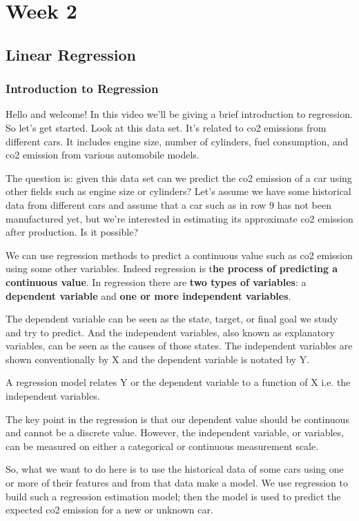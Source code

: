 \chapter{Week 2}
\section{Linear Regression}

	\subsection{Introduction to Regression}	
	
	Hello and welcome! In this video we'll be giving a brief introduction to regression. So let's get started. Look at this data set. It's related to co2 emissions from different cars. 
	It includes engine size, number of cylinders, fuel consumption, and co2 emission from various automobile models. 
	
	The question is: given this data set can we predict the co2 emission of a car using other fields such as engine size or cylinders? Let's assume we have some historical data from different cars and assume that a car such as in row 9 has not been manufactured yet, but we're interested in estimating its approximate co2 emission after production. Is it possible? 
	
	We can use regression methods to predict a continuous value such as co2 emission using some other variables. Indeed regression is t\textbf{he process of predicting a continuous value}. 
	In regression there are \textbf{two types of variables}: a \textbf{dependent variable} and \textbf{one or more independent variables}. 
	
	The dependent variable can be seen as the state, target, or final goal we study and try to predict. 
	And the independent variables, also known as explanatory variables, can be seen as the causes of those states. The independent variables are shown conventionally by X and the dependent variable is notated by Y.
	
	A regression model relates Y or the dependent variable to a function of X i.e. the independent variables. 
	
	The key point in the regression is that our dependent value should be continuous and cannot be a discrete value. 
	However, the independent variable, or variables, can be measured on either a categorical or continuous measurement scale. 
	
	So, what we want to do here is to use the historical data of some cars using one or more of their features and from that data make a model. We use regression to build such a regression estimation model; then the model is used to predict the expected co2 emission for a new or unknown car. 
	

